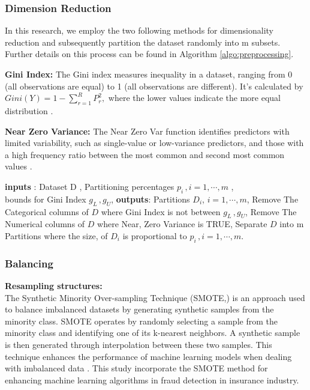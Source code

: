 \documentclass[12pt]{article}
\begin{document}
\subsubsection*{Dimension Reduction}
In this research, we employ the two following methods for
dimensionality reduction and subsequently partition the dataset
randomly into m subsets. Further details on this process can be
found in Algorithm \ref{algo:preprocessing}.

\textbf{\small Gini Index:} The Gini index measures inequality in
a dataset, ranging from 0 (all observations are equal) to 1 (all
observations are different). It's calculated by $Gini(Y) = 1 -
\displaystyle\sum_{r=1}^{R} P_r^2,$ where the lower values
indicate the more equal distribution \cite{A59}.

\textbf{Near Zero Variance:} The Near Zero Var function identifies
predictors with limited variability, such as single-value or
low-variance predictors, and those with a high frequency ratio
between the most common and second most common values \cite{A59}.
        \begin{algorithm}[H]
            \footnotesize
            \caption{PreProcessing Algorithm}\label{algo:preprocessing}
            \begin{algorithmic}
                \STATE \textbf{inputs} :  Dataset D ,   Partitioning percentages $p_i \,, i = 1, \cdots , m$ ,\\ bounds for Gini Index $g_{L} \, , g_{U}$,
                \STATE \textbf{outputs}: Partitions $D_i$, $ i = 1, \cdots , m$,
                \STATE Remove The Categorical columns of $D$ where Gini Index is not between $g_{L} \, , g_{U}$,
                \STATE Remove The Numerical columns of $D$ where Near, Zero Variance is TRUE,
                \STATE Separate  $D$ into m Partitions where the size, of $D_i$ is proportional to $p_i \,, i = 1, \cdots , m$.
            \end{algorithmic}
        \end{algorithm}

\subsubsection*{Balancing}
        \textbf{\small Resampling structures:}\\
The Synthetic Minority Over-sampling Technique (SMOTE,) is an
approach used to balance imbalanced datasets by generating
synthetic samples from the minority class. SMOTE operates by
randomly selecting a sample from the minority class and
identifying one of its k-nearest neighbors. A synthetic sample is
then generated through interpolation between these two samples.
This technique enhances the performance of machine learning models
when dealing with imbalanced data \cite{A62}.
This study incorporate the SMOTE method for enhancing machine
learning algorithms in fraud detection in insurance industry.
\end{document}
